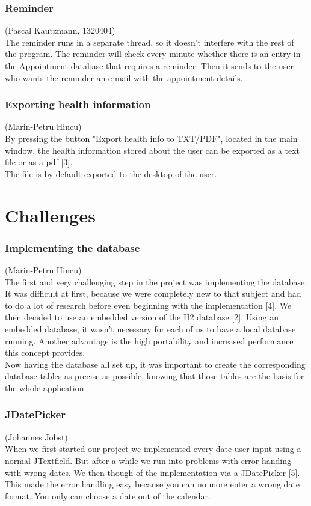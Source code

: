 \documentclass[a4paper, 12pt]{report}
\begin{document}
\subsection{Reminder}
{\tiny (Pascal Kautzmann, 1320404)\\}
The reminder runs in a separate thread, so it doesn't interfere with the rest of the program.
The reminder will check every minute whether there is an entry in the Appointment-database that requires a reminder. 
Then it sends to the user who wants the reminder an e-mail with the appointment details.

\subsection{Exporting health information}
{\tiny (Marin-Petru Hincu)\\}
By pressing the button "Export health info to TXT/PDF", located in the main window, the health information stored about the user can be exported as a text file or as a pdf [3].\\ The file is by default exported to the desktop of the user.

\chapter{Challenges}
\subsection{Implementing the database}
{\tiny (Marin-Petru Hincu)\\}
The first and very challenging step in the project was implementing the database. It was difficult at first, because we were completely new to that subject and had to do a lot of research before even beginning with the implementation [4]. We then decided to use an embedded version of the H2 database [2].
Using an embedded database, it wasn't necessary for each of us to have a local database running. Another advantage is the high portability and increased performance this concept provides.\\
Now having the database all set up, it was important to create the corresponding database tables as precise as possible, knowing that those tables are the basis for the whole application. \\

\subsection{JDatePicker}
{\tiny (Johannes Jobst)\\}
When we first started our project we implemented every date user input using a normal JTextfield. But after a while we run into problems with error handing with wrong dates. We then though of the implementation via a JDatePicker [5]. This made the error handling easy because you can no more enter a wrong date format. You only can choose a date out of the calendar.
\end{document}
